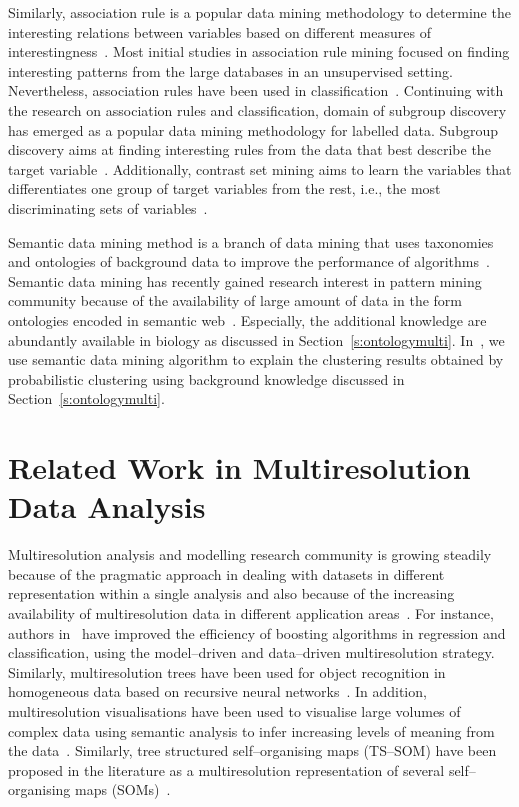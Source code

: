 Similarly, association rule is a popular data mining methodology 
to determine the interesting relations between variables based 
on different measures of 
interestingness~\cite{agrawal94,hipp00,klemettinen94,piatetsky91b}. 
Most initial studies in association rule mining focused 
on finding interesting patterns from the large databases
in an unsupervised setting. Nevertheless, association rules have 
been used in classification~\cite{jovanoski01,liu98}. 
Continuing with the research on association rules and classification, 
domain of subgroup discovery has emerged as a popular data mining 
methodology for labelled data. Subgroup discovery aims at finding 
interesting rules from the data that  best describe the target 
variable~\cite{gamberger02,franciso11,novak09}. Additionally, 
contrast set mining aims to learn the variables that 
differentiates one group of target variables from the rest, i.e., 
the most discriminating sets of variables~\cite{bay01,novak09}.


Semantic data mining method is a branch 
of data mining that uses taxonomies and ontologies of background data 
to improve the performance of 
algorithms~\cite{lavrac2011,AnzeCJ2012,Vavpetic13jiis}. 
Semantic data mining has recently gained research 
interest in pattern mining community because of the availability 
of large amount of data in the form ontologies encoded in semantic
web~\cite{lavrac2011}.  Especially, the additional knowledge are 
abundantly available in biology as discussed in 
Section~\ref{s:ontologymulti}. In~,
we use semantic data mining algorithm to explain the clustering 
results obtained by probabilistic clustering using background knowledge
discussed in Section~\ref{s:ontologymulti}.

\section{Related Work in Multiresolution Data Analysis}
\label{s:relatedMultiRes}

Multiresolution analysis and modelling research community is growing steadily because 
of the pragmatic approach in dealing with datasets in different 
representation within a single analysis and also because of the 
increasing availability of multiresolution data in different 
application areas~\cite{barth2002multiscale,he2000wavelet,iske2004}. 
For instance, authors in~\cite{reddy2007} have %
improved the efficiency of boosting algorithms in regression and 
classification, using the model--driven and data--driven multiresolution
strategy. Similarly, multi\-resolu\-tion trees have been used for object
recognition in homogeneous data based on recursive neural 
networks~\cite{bianchini2006}. In addition,
multiresolution visualisations have been used to visualise  
large volumes of complex data using semantic analysis to 
infer increasing levels of meaning from the data~\cite{hussain11}.
Similarly, tree structured self--organising maps (TS--SOM) have been 
proposed in the literature as a multiresolution representation of
several self--organising maps (SOMs)~\cite{koikkalainen94}.


